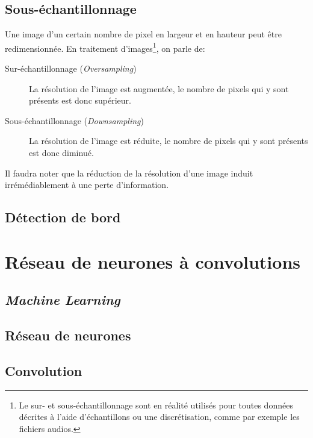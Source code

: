 \subsection{Sous-échantillonnage}
Une image d'un certain nombre de pixel en largeur et en hauteur peut être redimensionnée. En traitement d'images\footnote{Le sur- et sous-échantillonnage sont en réalité utilisés pour toutes données décrites à l'aide d'échantillons ou une discrétisation, comme par exemple les fichiers audios.}, on parle de:
\begin{description}
    \item[Sur-échantillonnage (\textit{Oversampling})] La résolution de l'image est augmentée, le nombre de pixels qui y sont présents est donc supérieur. 
    \item[Sous-échantillonnage (\textit{Downsampling})] La résolution de l'image est réduite, le nombre de pixels qui y sont présents est donc diminué. 
\end{description}

Il faudra noter que la réduction de la résolution d'une image induit irrémédiablement à une perte d'information. 


\subsection{Détection de bord}

\section{Réseau de neurones à convolutions}
\subsection{\textit{Machine Learning}}

\subsection{Réseau de neurones}

\subsection{Convolution}\label{techno.traitement.convolution}


